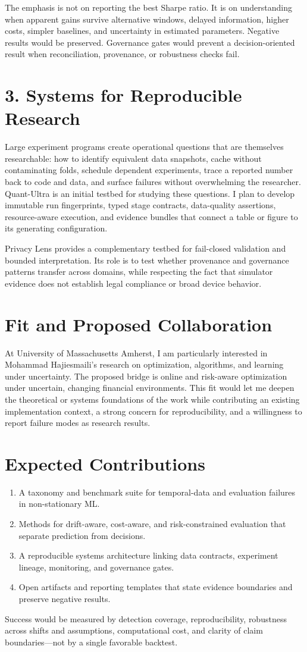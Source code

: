 \documentclass[11pt]{article}
\begin{document}
The emphasis is not on reporting the best Sharpe ratio. It is on understanding when apparent gains survive alternative windows, delayed information, higher costs, simpler baselines, and uncertainty in estimated parameters. Negative results would be preserved. Governance gates would prevent a decision-oriented result when reconciliation, provenance, or robustness checks fail.

\section*{3. Systems for Reproducible Research}
Large experiment programs create operational questions that are themselves researchable: how to identify equivalent data snapshots, cache without contaminating folds, schedule dependent experiments, trace a reported number back to code and data, and surface failures without overwhelming the researcher. Quant-Ultra is an initial testbed for studying these questions. I plan to develop immutable run fingerprints, typed stage contracts, data-quality assertions, resource-aware execution, and evidence bundles that connect a table or figure to its generating configuration.

Privacy Lens provides a complementary testbed for fail-closed validation and bounded interpretation. Its role is to test whether provenance and governance patterns transfer across domains, while respecting the fact that simulator evidence does not establish legal compliance or broad device behavior.

\section*{Fit and Proposed Collaboration}
At University of Massachusetts Amherst, I am particularly interested in Mohammad Hajiesmaili's research on optimization, algorithms, and learning under uncertainty. The proposed bridge is online and risk-aware optimization under uncertain, changing financial environments. This fit would let me deepen the theoretical or systems foundations of the work while contributing an existing implementation context, a strong concern for reproducibility, and a willingness to report failure modes as research results.

\section*{Expected Contributions}
\begin{enumerate}
\item A taxonomy and benchmark suite for temporal-data and evaluation failures in non-stationary ML.
\item Methods for drift-aware, cost-aware, and risk-constrained evaluation that separate prediction from decisions.
\item A reproducible systems architecture linking data contracts, experiment lineage, monitoring, and governance gates.
\item Open artifacts and reporting templates that state evidence boundaries and preserve negative results.
\end{enumerate}

Success would be measured by detection coverage, reproducibility, robustness across shifts and assumptions, computational cost, and clarity of claim boundaries---not by a single favorable backtest.
\end{document}
